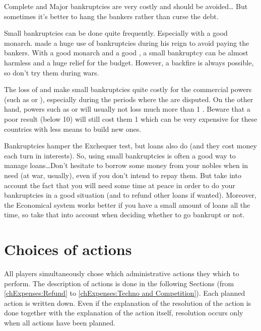 \begin{playtip}
  Complete and Major bankruptcies are very costly and should be avoided\ldots
  But sometimes it's better to hang the bankers rather than curse the debt.

  Small bankruptcies can be done quite frequently. Especially with a good
  monarch.  made a huge use of bankruptcies during his
  reign to avoid paying the bankers. With a good monarch and a good \STAB, a
  small bankruptcy can be almost harmless and a huge relief for the
  budget. However, a backfire is always possible, so don't try them during
  wars.

  The loss of \TradeFLEET and \TFI make small bankruptcies quite costly for
  the commercial powers (such as \ANG or \HOL), especially during the periods
  where the  are disputed. On the other hand, powers such
  as \RUS or \POL will usually not loss much more than 1 \STAB. Beware that a
  poor result (below 10) will still cost them 1 \MNU which can be very
  expensive for these countries with less means to build new ones.

  Bankruptcies hamper the Exchequer test, but loans also do (and they cost
  money each turn in interests). So, using small bankruptcies is often a good
  way to manage loans\ldots Don't hesitate to borrow some money from your
  nobles when in need (at war, usually), even if you don't intend to repay
  them. But take into account the fact that you will need some time at peace
  in order to do your bankruptcies in a good situation (and to refund other
  loans if wanted). Moreover, the Economical system works better if you have a
  small amount of loans all the time, so take that into account when deciding
  whether to go bankrupt or not.
\end{playtip}



\section{Choices of actions}\label{chExpenses:Choice of actions}
\aparag All players simultaneously chose which administrative actions they
which to perform. The description of actions is done in the following Sections
(from \ref{chExpenses:Refund} to \ref{chExpenses:Techno and Competition}).
\bparag Each planned action is written down. Even if the explanation of the
resolution of the action is done together with the explanation of the action
itself, resolution occurs only when all actions have been planned.

